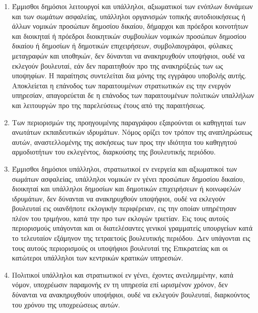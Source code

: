 \documentclass[twoside, a4paper, 10pt]{article}
\begin{document}
\begin{multicols}{2}
\begin{enumerate}
\begin{BigQuote}
\begin{enumerate}
  \item[1.] Έμμισθοι δημόσιοι λειτουργοί και υπάλληλοι, αξιωματικοί των ενόπλων δυνάμεων και των σωμάτων ασφαλείας, υπάλληλοι οργανισμών τοπικής αυτοδιοικήσεως ή άλλων νομικών προσώπων δημοσίου δικαίου, δήμαρχοι και πρόεδροι κοινοτήτων και διοικηταί ή πρόεδροι διοικητικών συμβουλίων νομικών προσώπων δημοσίου δικαίου ή δημοσίων ή δημοτικών επιχειρήσεων, συμβολαιογράφοι, φύλακες μεταγραφών και υποθηκών, δεν δύνανται να ανακηρυχθούν υποψήφιοι, ουδέ να εκλεγούν βουλευταί, εάν δεν παραιτηθούν προ της ανακηρύξεώς των ως υποψηφίων. Η παραίτησις συντελείται δια μόνης της εγγράφου υποβολής αυτής. Αποκλείεται η επάνοδος των παραιτουμένων στρατιωτικών εις την ενεργόν υπηρεσίαν, απαγορεύεται δε η επάνοδος των παραιτουμένων πολιτικών υπαλλήλων και λειτουργών προ της παρελεύσεως έτους από της παραιτήσεως.
  \item[2.] Των περιορισμών της προηγουμένης παραγράφου εξαιρούνται οι καθηγηταί των ανωτάτων εκπαιδευτικών ιδρυμάτων. Νόμος ορίζει τον τρόπον της αναπληρώσεως αυτών, αναστελλομένης της ασκήσεως των προς την ιδιότητα του καθηγητού αρμοδιοτήτων του εκλεγέντος, διαρκούσης της βουλευτικής περιόδου.
  \item[3.] Έμμισθοι δημόσιοι υπάλληλοι, στρατιωτικοί εν ενεργεία και αξιωματικοί των σωμάτων ασφαλείας, υπάλληλοι νομικών εν γένει προσώπων δημοσίου δικαίου, διοικηταί και υπάλληλοι δημοσίων και δημοτικών επιχειρήσεων ή κοινωφελών ιδρυμάτων, δεν δύνανται να ανακηρυχθούν υποψήφιοι, ουδέ να εκλεγούν βουλευταί εις οιανδήποτε εκλογικήν περιφέρειαν, εις την οποίαν υπηρέτησαν πλέον του τριμήνου, κατά την προ των εκλογών τριετίαν. Εις τους αυτούς περιορισμούς υπάγονται και οι διατελέσαντες γενικοί γραμματείς υπουργείων κατά το τελευταίον εξάμηνον της τετραετούς βουλευτικής περιόδου. Δεν υπάγονται εις τους αυτούς περιορισμούς οι υποψήφιοι βουλευταί της Επικρατείας και οι κατώτεροι υπάλληλοι των κεντρικών κρατικών υπηρεσιών.
  \item[4.] Πολιτικοί υπάλληλοι και στρατιωτικοί εν γένει, έχοντες ανειλημμένην, κατά νόμον, υποχρέωσιν παραμονής εν τη υπηρεσία επί ωρισμένον χρόνον, δεν δύνανται να ανακηρυχθούν υποψήφιοι, ουδέ να εκλεγούν βουλευταί, διαρκούντος του χρόνου της υποχρεώσεως αυτών.
\end{enumerate}


\end{BigQuote}
\end{enumerate}
\end{multicols}
\end{document}
